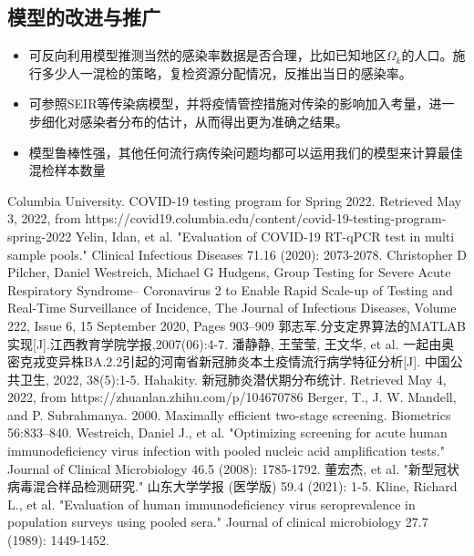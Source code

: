 \documentclass[withoutpreface,bwprint]{cumcmthesis} %
\begin{document}
\subsection{模型的改进与推广}
\begin{itemize}
    \item 可反向利用模型推测当然的感染率数据是否合理，比如已知地区$\Omega_k$的人口。施行多少人一混检的策略，复检资源分配情况，反推出当日的感染率。
    
    \item 可参照SEIR等传染病模型，并将疫情管控措施对传染的影响加入考量，进一步细化对感染者分布的估计，从而得出更为准确之结果。
    
    \item 模型鲁棒性强，其他任何流行病传染问题均都可以运用我们的模型来计算最佳混检样本数量
\end{itemize}


\newpage

\begin{thebibliography}{100}
Columbia University. COVID-19 testing program for Spring 2022. Retrieved May 3, 2022, from https://covid19.columbia.edu/content/covid-19-testing-program-spring-2022
Yelin, Idan, et al. "Evaluation of COVID-19 RT-qPCR test in multi sample pools." Clinical Infectious Diseases 71.16 (2020): 2073-2078.
Christopher D Pilcher, Daniel Westreich, Michael G Hudgens, Group Testing for Severe Acute Respiratory Syndrome– Coronavirus 2 to Enable Rapid Scale-up of Testing and Real-Time Surveillance of Incidence, The Journal of Infectious Diseases, Volume 222, Issue 6, 15 September 2020, Pages 903–909
郭志军.分支定界算法的MATLAB实现[J].江西教育学院学报,2007(06):4-7.
潘静静, 王莹莹, 王文华, et al. 一起由奥密克戎变异株BA.2.2引起的河南省新冠肺炎本土疫情流行病学特征分析[J]. 中国公共卫生, 2022, 38(5):1-5.
Hahakity. 新冠肺炎潜伏期分布统计. Retrieved May 4, 2022, from https://zhuanlan.zhihu.com/p/104670786
Berger, T., J. W. Mandell, and P. Subrahmanya. 2000. Maximally efficient two-stage screening. Biometrics 56:833–840.
Westreich, Daniel J., et al. "Optimizing screening for acute human immunodeficiency virus infection with pooled nucleic acid amplification tests." Journal of Clinical Microbiology 46.5 (2008): 1785-1792.
董宏杰, et al. "新型冠状病毒混合样品检测研究." 山东大学学报 (医学版) 59.4 (2021): 1-5.
Kline, Richard L., et al. "Evaluation of human immunodeficiency virus seroprevalence in population surveys using pooled sera." Journal of clinical microbiology 27.7 (1989): 1449-1452.

\end{thebibliography}
\end{document}
